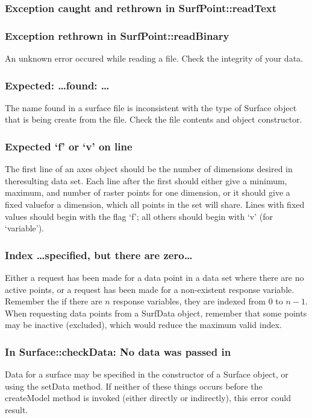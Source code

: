 \documentclass{article}
\begin{document}
\subsubsection{Exception caught and rethrown in SurfPoint::readText}
\subsubsection{Exception rethrown in SurfPoint::readBinary}
An unknown error occured while reading a file.  Check the integrity of your data.

\subsubsection{Expected: \ldots found: \ldots} 
The name found in a surface file is inconsistent with the type of Surface object that is being create from the file.  Check the file contents and object constructor.

\subsubsection{Expected `f' or `v' on line}
The first line of an axes object should be the number of dimensions desired in theresulting data set.  Each line after the first should either give a minimum, maximum, and number of raster points for one dimension, or it should give a fixed valuefor a dimension, which all points in the set will share.  Lines with fixed values should begin with the flag `f'; all others should begin with `v' (for `variable').
\subsubsection{Index \ldots specified, but there are zero\ldots}
Either a request has been made for a data point in a data set where there are no active points, or a request has been made for a non-existent response variable.  Remember the if there are $n$ response variables, they are indexed from $0$ to $n-1$.  When requesting data points from a SurfData object, remember that some points may be inactive (excluded), which would reduce the maximum valid index.

\subsubsection{In Surface::checkData: No data was passed in}
Data for a surface may be specified in the constructor of a Surface object, or using the setData method.  If neither of these things occurs before the createModel method is invoked (either directly or indirectly), this error could result.
\end{document}
